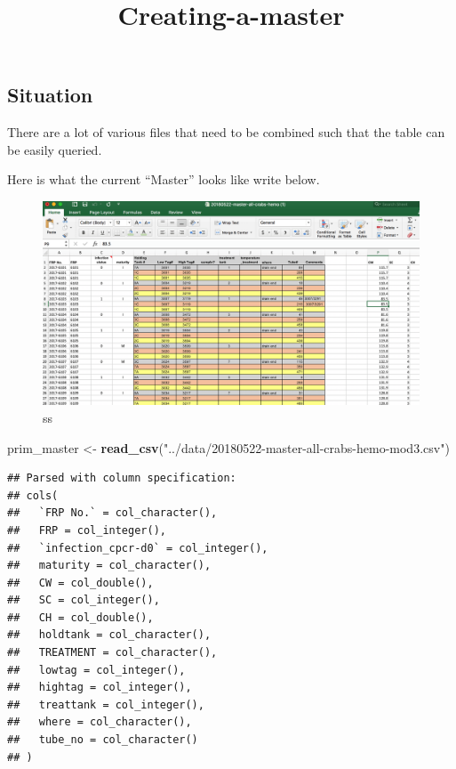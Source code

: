 \documentclass[]{article}
\title{Creating-a-master}
\author{}
\date{}
\newenvironment{Shaded}{\begin{snugshade}}{\end{snugshade}}
\newcommand{\KeywordTok}[1]{\textcolor[rgb]{0.13,0.29,0.53}{\textbf{#1}}}
\newcommand{\StringTok}[1]{\textcolor[rgb]{0.31,0.60,0.02}{#1}}
\newcommand{\NormalTok}[1]{#1}
\begin{document}
\maketitle

\subsection{Situation}\label{situation}

There are a lot of various files that need to be combined such that the
table can be easily queried.

Here is what the current ``Master'' looks like write below.

\begin{figure}
\centering
\includegraphics{img/master.png}
\caption{ss}
\end{figure}

\begin{Shaded}
\begin{Highlighting}[]
\NormalTok{    prim_master <-}\StringTok{ }\KeywordTok{read_csv}\NormalTok{(}\StringTok{"../data/20180522-master-all-crabs-hemo-mod3.csv"}\NormalTok{)}
\end{Highlighting}
\end{Shaded}

\begin{verbatim}
## Parsed with column specification:
## cols(
##   `FRP No.` = col_character(),
##   FRP = col_integer(),
##   `infection_cpcr-d0` = col_integer(),
##   maturity = col_character(),
##   CW = col_double(),
##   SC = col_integer(),
##   CH = col_double(),
##   holdtank = col_character(),
##   TREATMENT = col_character(),
##   lowtag = col_integer(),
##   hightag = col_integer(),
##   treattank = col_integer(),
##   where = col_character(),
##   tube_no = col_character()
## )
\end{verbatim}
\end{document}
